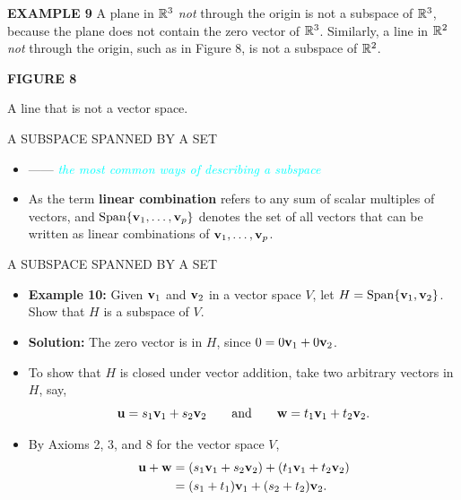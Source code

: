 \begin{frame}[shrink=11]
\textcolor{red!70!black}{\textbf{EXAMPLE 9}}\quad
A plane in $\mathbb{R}^3$ \emph{not} through the origin is not a subspace of $\mathbb{R}^3$, because the plane does not contain the zero vector of $\mathbb{R}^3$. Similarly, a line in $\mathbb{R}^2$ \emph{not} through the origin, such as in Figure 8, is not a subspace of $\mathbb{R}^2$.
\vspace{0.7cm}
\begin{center}

\textbf{FIGURE 8}\par A line that is not a vector space.
\end{center}
\end{frame}

\begin{frame}{A SUBSPACE SPANNED BY A SET}
\begin{itemize}
\item ------ \textcolor{cyan}{\emph{the most common ways of describing a subspace}}
\item As the term \textcolor{sourceblue}{\textbf{linear combination}} refers to any sum of scalar multiples of vectors, and \textcolor{sourceblue}{\textbf{$\operatorname{Span}\{\mathbf{v}_1,\ldots,\mathbf{v}_p\}$}} denotes the set of all vectors that can be written as linear combinations of $\mathbf{v}_1,\ldots,\mathbf{v}_p$.
\end{itemize}
\end{frame}

\begin{frame}[shrink=14]{A SUBSPACE SPANNED BY A SET}
\begin{itemize}
\item \textbf{Example 10:} Given $\mathbf{v}_1$ and $\mathbf{v}_2$ in a vector space $V$, let $H=\operatorname{Span}\{\mathbf{v}_1,\mathbf{v}_2\}$. Show that $H$ is a subspace of $V$.
\item \textbf{Solution:} The zero vector is in $H$, since $0=0\mathbf{v}_1+0\mathbf{v}_2$.
\item To show that $H$ is closed under vector addition, take two arbitrary vectors in $H$, say,
\[
\mathbf{u}=s_1\mathbf{v}_1+s_2\mathbf{v}_2
\qquad\text{and}\qquad
\mathbf{w}=t_1\mathbf{v}_1+t_2\mathbf{v}_2.
\]
\item By Axioms 2, 3, and 8 for the vector space $V$,
\begin{align*}
\mathbf{u}+\mathbf{w}&=(s_1\mathbf{v}_1+s_2\mathbf{v}_2)+(t_1\mathbf{v}_1+t_2\mathbf{v}_2)\\
&=(s_1+t_1)\mathbf{v}_1+(s_2+t_2)\mathbf{v}_2.
\end{align*}
\end{itemize}
\end{frame}

